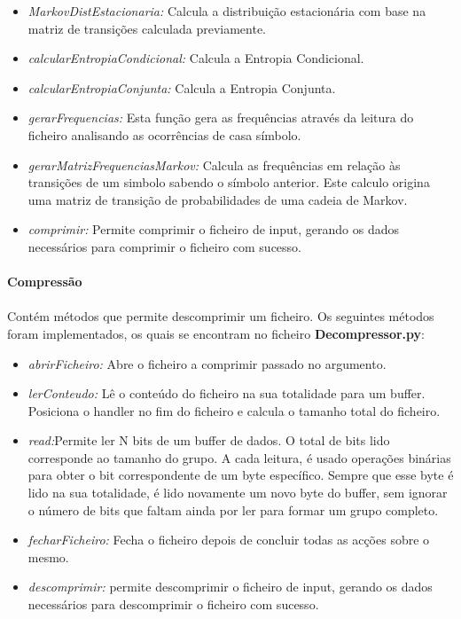 \documentclass[paper=a4, fontsize=11pt]{scrartcl}
\numberwithin{equation}{section}		%
\numberwithin{figure}{section}			%
\numberwithin{table}{section}				%
\begin{document}
\begin{itemize}
\item {\it MarkovDistEstacionaria:} Calcula a distribuição estacionária com base na matriz de transições calculada previamente.
\item {\it calcularEntropiaCondicional:} Calcula a Entropia Condicional.
\item {\it calcularEntropiaConjunta:} Calcula a Entropia Conjunta. 
\item {\it gerarFrequencias:} Esta função gera as frequências através da leitura do ficheiro analisando as ocorrências de casa símbolo.

\item {\it gerarMatrizFrequenciasMarkov:} Calcula as frequências em relação às transições de um simbolo sabendo o símbolo anterior. Este calculo origina uma matriz de transição de probabilidades de uma cadeia de Markov.

\item {\it comprimir:} Permite comprimir o ficheiro de input, gerando os dados necessários para comprimir o ficheiro com sucesso.

\end{itemize}

\pagebreak 			%


\paragraph{Compressão}
\paragraph{}Contém métodos que permite descomprimir um ficheiro. Os seguintes métodos foram implementados, os quais se encontram no ficheiro {\bf Decompressor.py}:\\


\begin{itemize}
\item {\it abrirFicheiro:} Abre o ficheiro a comprimir passado no argumento.
\item {\it lerConteudo:} Lê o conteúdo do ficheiro na sua totalidade para um buffer.
\\Posiciona o handler no fim do ficheiro e calcula o tamanho total do ficheiro.
\item {\it read:}Permite ler N bits de um buffer de dados. O total de bits lido corresponde ao tamanho do grupo. A cada leitura, é usado operações binárias para obter o bit correspondente de um byte específico. Sempre que esse byte é lido na sua totalidade, é lido novamente um novo byte do buffer, sem ignorar o número de bits que faltam ainda por ler para formar um grupo completo.
\item {\it fecharFicheiro:} Fecha o ficheiro depois de concluir todas as acções sobre o mesmo.
\item {\it descomprimir:} permite descomprimir o ficheiro de input, gerando os dados necessários para descomprimir o ficheiro com sucesso.
\end{itemize}
\pagebreak			%
\end{document}
